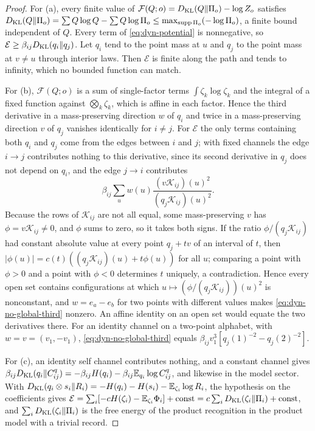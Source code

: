 \begin{proof}
For (a), every finite value of $\mathcal F(Q;o)=D_{\mathrm{KL}}(Q\Vert\Pi_o)-\log Z_o$ satisfies $D_{\mathrm{KL}}(Q\Vert\Pi_o)=\sum Q\log Q-\sum Q\log\Pi_o\leq\max_{\operatorname{supp}\Pi_o}(-\log\Pi_o)$, a finite bound independent of $Q$. Every term of \cref{eq:dyn-potential} is nonnegative, so $\mathcal E\geq\beta_{ij}D_{\mathrm{KL}}(q_i\Vert q_j)$. Let $q_i$ tend to the point mass at $u$ and $q_j$ to the point mass at $v\neq u$ through interior laws. Then $\mathcal E$ is finite along the path and tends to infinity, which no bounded function can match.

For (b), $\mathcal F(Q;o)$ is a sum of single-factor terms $\int\zeta_k\log\zeta_k$ and the integral of a fixed function against $\bigotimes_k\zeta_k$, which is affine in each factor. Hence the third derivative in a mass-preserving direction $w$ of $q_i$ and twice in a mass-preserving direction $v$ of $q_j$ vanishes identically for $i\neq j$. For $\mathcal E$ the only terms containing both $q_i$ and $q_j$ come from the edges between $i$ and $j$; with fixed channels the edge $i\to j$ contributes nothing to this derivative, since its second derivative in $q_j$ does not depend on $q_i$, and the edge $j\to i$ contributes
\begin{equation}
 \beta_{ij}\sum_uw(u)\frac{(v\mathcal K_{ij})(u)^2}{(q_j\mathcal K_{ij})(u)^2}.
 \label{eq:dyn-no-global-third}
\end{equation}
Because the rows of $\mathcal K_{ij}$ are not all equal, some mass-preserving $v$ has $\phi=v\mathcal K_{ij}\neq0$, and $\phi$ sums to zero, so it takes both signs. If the ratio $\phi/(q_j\mathcal K_{ij})$ had constant absolute value at every point $q_j+tv$ of an interval of $t$, then $|\phi(u)|=c(t)((q_j\mathcal K_{ij})(u)+t\phi(u))$ for all $u$; comparing a point with $\phi>0$ and a point with $\phi<0$ determines $t$ uniquely, a contradiction. Hence every open set contains configurations at which $u\mapsto(\phi/(q_j\mathcal K_{ij}))(u)^2$ is nonconstant, and $w=e_a-e_b$ for two points with different values makes \cref{eq:dyn-no-global-third} nonzero. An affine identity on an open set would equate the two derivatives there. For an identity channel on a two-point alphabet, with $w=v=(v_1,-v_1)$, \cref{eq:dyn-no-global-third} equals $\beta_{ij}v_1^3[q_j(1)^{-2}-q_j(2)^{-2}]$.

For (c), an identity self channel contributes nothing, and a constant channel gives $\beta_{ij}D_{\mathrm{KL}}(q_i\Vert C^q_{ij})=-\beta_{ij}H(q_i)-\beta_{ij}\mathbb E_{q_i}\log C^q_{ij}$, and likewise in the model sector. With $D_{\mathrm{KL}}(q_i\otimes s_i\Vert R_i)=-H(q_i)-H(s_i)-\mathbb E_{\zeta_i}\log R_i$, the hypothesis on the coefficients gives $\mathcal E=\sum_i[-cH(\zeta_i)-\mathbb E_{\zeta_i}\Phi_i]+\mathrm{const}=c\sum_iD_{\mathrm{KL}}(\zeta_i\Vert\Pi_i)+\mathrm{const}$, and $\sum_iD_{\mathrm{KL}}(\zeta_i\Vert\Pi_i)$ is the free energy of the product recognition in the product model with a trivial record.
\end{proof}

